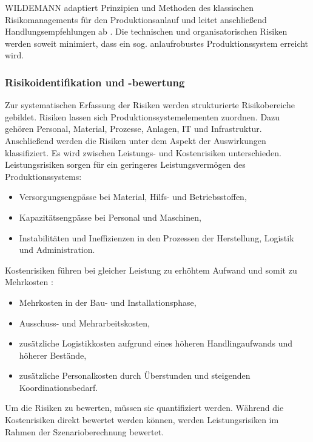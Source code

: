 WILDEMANN adaptiert Prinzipien und Methoden des klassischen Risikomanagements für den Produktionsanlauf und leitet anschließend Handlungsempfehlungen ab \autocite{Wildemann2004}. Die technischen und organisatorischen Risiken werden soweit minimiert, dass ein sog. anlaufrobustes Produktionssystem erreicht wird. 


\subsubsection*{Risikoidentifikation und -bewertung}
Zur systematischen Erfassung der Risiken werden strukturierte Risikobereiche gebildet. 
Risiken lassen sich Produktionssystemelementen zuordnen. Dazu gehören Personal, Material, Prozesse, Anlagen, IT und Infrastruktur. Anschließend werden die Risiken unter dem Aspekt der Auswirkungen klassifiziert. Es wird zwischen Leistungs- und Kostenrisiken unterschieden. Leistungsrisiken sorgen für ein geringeres Leistungsvermögen des Produktionssystems:
\begin{itemize}
 \item Versorgungsengpässe bei Material,
Hilfs- und Betriebsstoffen,
\item Kapazitätsengpässe bei Personal und
Maschinen,
\item Instabilitäten und Ineffizienzen in
den Prozessen der Herstellung,
Logistik und Administration.
\end{itemize}
Kostenrisiken führen bei gleicher Leistung zu erhöhtem Aufwand und somit zu Mehrkosten \autocite{Wiendahl2002}: 
\begin{itemize}
 \item Mehrkosten in der Bau- und Installationsphase,
\item Ausschuss- und Mehrarbeitskosten,
\item zusätzliche Logistikkosten aufgrund
eines höheren Handlingaufwands
und höherer Bestände,
\item zusätzliche Personalkosten durch
Überstunden und steigenden Koordinationsbedarf.
\end{itemize}

Um die Risiken zu bewerten, müssen sie quantifiziert werden. Während die Kostenrisiken direkt bewertet werden können, werden Leistungsrisiken im Rahmen der Szenarioberechnung bewertet. 

